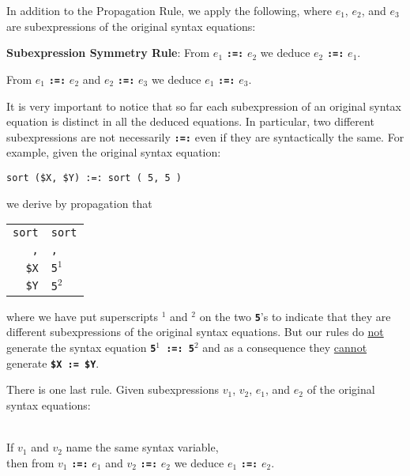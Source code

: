 \documentclass[12pt]{article}
\newcommand{\TT}[1]{{\tt \bfseries #1}}
\newcommand{\key}[1]{{\rm \bfseries #1}}
\newenvironment{indpar}[1][0.3in]%
	{\begin{list}{}%
		     {\setlength{\itemsep}{0in}%
		      \setlength{\topsep}{0in}%
		      \setlength{\parsep}{1ex}%
		      \setlength{\labelwidth}{#1}%
		      \setlength{\leftmargin}{#1}%
		      \addtolength{\leftmargin}{\labelsep}}%
	 \item}%
	{\end{list}}
\begin{document}
In addition to the Propagation Rule, we apply the following, where
$e_1$, $e_2$, and $e_3$ are subexpressions of the original
syntax equations:

\begin{indpar}
\begin{list}{}{}
\item [\key{Subexpression Symmetry Rule}:]%
\label{SUBEXPRESSION-SYMMETRY-RULE}
From $e_1$ \TT{:=:} $e_2$ we deduce $e_2$ \TT{:=:} $e_1$.

\item [\key{Subexpression Transitivity Rule}%
            :]%
\label{SUBEXPRESSION-TRANSITIVITY-RULE}
From $e_1$ \TT{:=:} $e_2$ and $e_2$ \TT{:=:} $e_3$
we deduce $e_1$ \TT{:=:} $e_3$.

\end{list}
\end{indpar}

It is very important to notice that so far each subexpression of an
original syntax equation is distinct in all the deduced equations.
In particular, two different subexpressions
are not necessarily \TT{:=:} even if they are syntactically the same.
For example, given the original syntax equation:

\begin{center}
\verb/sort ($X, $Y) :=: sort ( 5, 5 )/
\end{center}

we derive by propagation that

\begin{center}
\begin{tabular}{r@\TT{~:=:~}l}
\verb/sort/ & \verb/sort/ \\
\verb/,/ & \verb/,/ \\
\verb/$X/ & \verb/5/$^1$ \\
\verb/$Y/ & \verb/5/$^2$ \\
\end{tabular}
\end{center}

where we have put superscripts $^1$ and $^2$ on the two \TT{5}'s to
indicate that they are different subexpressions of the original
syntax equations.  But our rules do \underline{not}
generate the syntax equation \TT{5$^1$ :=: 5$^2$} and as a consequence
they \underline{cannot} generate \TT{\$X := \$Y}.

There is one last rule.  Given subexpressions $v_1$, $v_2$,
$e_1$, and $e_2$ of the original syntax equations:

\begin{indpar}
\begin{list}{}{}
\item [\key{Syntax Variable Identity Rule}%
            :]%
\label{SYNTAX-VARIABLE-IDENTITY-RULE} ~\\
If $v_1$ and $v_2$ name the same syntax variable, \\
then from $v_1$ \TT{:=:} $e_1$ and $v_2$ \TT{:=:} $e_2$
we deduce $e_1$ \TT{:=:} $e_2$.

\end{list}
\end{indpar}
\end{document}
